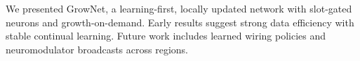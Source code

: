 We presented GrowNet, a learning-first, locally updated network with slot-gated neurons and growth-on-demand. Early results suggest strong data efficiency with stable continual learning. Future work includes learned wiring policies and neuromodulator broadcasts across regions.